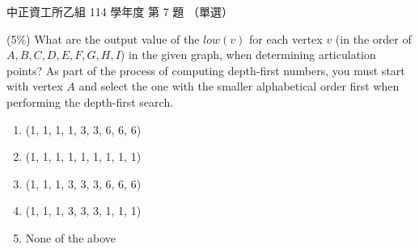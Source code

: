 \begin{pastexam}[label={px:ccu-114-csb-07}]{中正資工所乙組 114 學年度 第 7 題}
（單選）

(5\%) What are the output value of the $\mathit{low}(v)$ for each vertex $v$ (in the order of $A, B, C, D, E, F, G, H, I$) in the given graph, when determining articulation points? As part of the process of computing depth-first numbers, you must start with vertex $A$ and select the one with the smaller alphabetical order first when performing the depth-first search.

\begin{center}
\end{center}

\begin{enumerate}[label=\Alph*.]
\item (1, 1, 1, 1, 3, 3, 6, 6, 6)
\item (1, 1, 1, 1, 1, 1, 1, 1, 1)
\item (1, 1, 1, 3, 3, 3, 6, 6, 6)
\item (1, 1, 1, 3, 3, 3, 1, 1, 1)
\item None of the above
\end{enumerate}
\end{pastexam}

